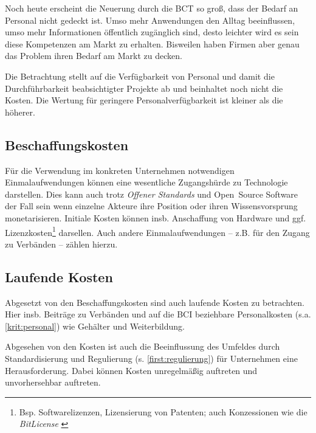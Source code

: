 Noch heute erscheint die Neuerung durch die \gls{BCT} so groß, dass der Bedarf an Personal nicht gedeckt ist.
Umso mehr Anwendungen den Alltag beeinflussen, umso mehr Informationen öffentlich zugänglich sind, desto leichter wird es sein diese Kompetenzen am Markt zu erhalten.
Bisweilen haben Firmen aber genau das Problem ihren Bedarf am Markt zu decken.

Die Betrachtung stellt auf die Verfügbarkeit von Personal und damit die Durchführbarkeit beabsichtigter Projekte ab und beinhaltet noch nicht die Kosten. 
Die Wertung für geringere Personalverfügbarkeit ist kleiner als die höherer.

\subsection{Beschaffungskosten}\label{kosten}

Für die Verwendung im konkreten Unternehmen notwendigen Einmalaufwendungen können eine wesentliche Zugangshürde zu Technologie darstellen.
Dies kann auch trotz \emph{Offener Standards} und Open~Source Software der Fall sein wenn einzelne Akteure ihre Position oder ihren Wissensvorsprung monetarisieren.
Initiale Kosten können insb. Anschaffung von Hardware und ggf. Lizenzkosten\footnote{Bsp. Softwarelizenzen, Lizensierung von Patenten; auch Konzessionen wie die \emph{BitLicense} \autocite{w:bitlicense}} darsellen.
Auch andere Einmalaufwendungen -- z.B. für den Zugang zu Verbänden -- zählen hierzu.

\subsection{Laufende Kosten}

Abgesetzt von den Beschaffungskosten sind auch laufende Kosten zu betrachten.
Hier insb. Beiträge zu Verbänden und auf die \gls{BCI} beziehbare Personalkosten (s.a. \ref{krit:personal}) wie Gehälter und Weiterbildung.

Abgesehen von den Kosten ist auch die Beeinflussung des Umfeldes durch
Standardisierung und Regulierung (\label{regulierung}s. \ref{first:regulierung}) für Unternehmen eine Herausforderung.
Dabei können Kosten unregelmäßig auftreten und unvorhersehbar auftreten.
